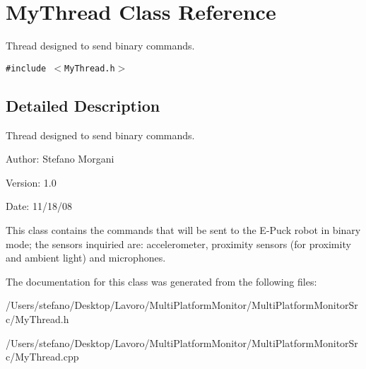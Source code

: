 \section{MyThread Class Reference}
\label{class_my_thread}
Thread designed to send binary commands.  


{\tt \#include $<$MyThread.h$>$}



\subsection{Detailed Description}
Thread designed to send binary commands. 

\begin{Desc}
\item[Author:]Stefano Morgani \end{Desc}
\begin{Desc}
\item[Version:]1.0 \end{Desc}
\begin{Desc}
\item[Date:]11/18/08\end{Desc}
This class contains the commands that will be sent to the E-Puck robot in binary mode; the sensors inquiried are: accelerometer, proximity sensors (for proximity and ambient light) and microphones. 

The documentation for this class was generated from the following files:\begin{CompactItemize}
\item 
/Users/stefano/Desktop/Lavoro/MultiPlatformMonitor/MultiPlatformMonitorSrc/MyThread.h\item 
/Users/stefano/Desktop/Lavoro/MultiPlatformMonitor/MultiPlatformMonitorSrc/MyThread.cpp\end{CompactItemize}
